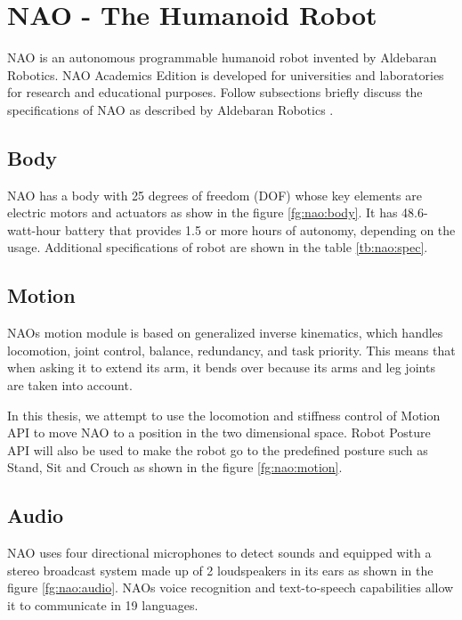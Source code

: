 \section{NAO - The Humanoid Robot} NAO is an autonomous programmable humanoid robot invented by Aldebaran Robotics. NAO Academics Edition is developed for universities and laboratories for research and educational purposes. Follow subsections briefly discuss the specifications of NAO as described by Aldebaran Robotics \cite{8}.




\subsection{Body} NAO has a body with 25 degrees of freedom (DOF) whose key elements are electric motors and actuators as show in the figure \ref{fg:nao:body}. It has 48.6-watt-hour battery that provides 1.5 or more hours of autonomy, depending on the usage. Additional specifications of robot are shown in the table \ref{tb:nao:spec}. 

\subsection{Motion} NAOs motion module is based on generalized inverse kinematics, which handles locomotion, joint control, balance, redundancy, and task priority. This means that when asking it to extend its arm, it bends over because its arms and leg joints are taken into account.

In this thesis, we attempt to use the locomotion and stiffness control of Motion API to move NAO to a position in the two dimensional space. Robot Posture API will also be used to make the robot go to the predefined posture such as Stand, Sit and Crouch as shown in the figure \ref{fg:nao:motion}.



\subsection{Audio} NAO uses four directional microphones to detect sounds and equipped with a stereo broadcast system made up of 2 loudspeakers in its ears as shown in the figure \ref{fg:nao:audio}. NAOs voice recognition and text-to-speech capabilities allow it to communicate in 19 languages. 

 

